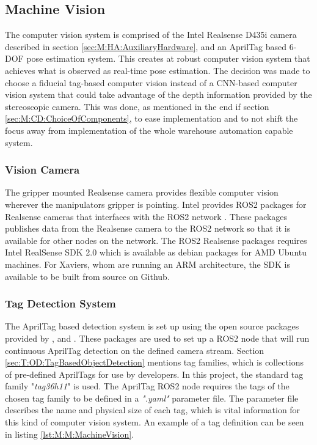 \subsection{Machine Vision} \label{sec:M:PAP:MachineVision}
The computer vision system is comprised of the Intel Realsense D435i camera described in section \ref{sec:M:HA:AuxiliaryHardware}, and an AprilTag based 6-DOF pose estimation system. This creates at robust computer vision system that achieves what is observed as real-time pose estimation. The decision was made to choose a fiducial tag-based computer vision instead of a CNN-based computer vision system that could take advantage of the depth information provided by the stereoscopic camera. This was done, as mentioned in the end if section \ref{sec:M:CD:ChoiceOfComponents}, to ease implementation and to not shift the focus away from implementation of the whole warehouse automation capable system.

\subsubsection{Vision Camera} 
The gripper mounted Realsense camera provides flexible computer vision wherever the manipulators gripper is pointing. Intel provides ROS2 packages for Realsense cameras that interfaces with the ROS2 network \cite{realsense_ros_repo}. These packages publishes data from the Realsense camera to the ROS2 network so that it is available for other nodes on the network. The ROS2 Realsense packages requires Intel RealSense SDK 2.0 which is available as debian packages for AMD Ubuntu machines. For Xaviers, whom are running an ARM architecture, the SDK is available to be built from source on Github\cite{realsense_jetson_guide}.

\subsubsection{Tag Detection System} \label{sec:M:MRC:MV:TagDetectionSystem}
The AprilTag based detection system is set up using the open source packages provided by \cite{apriltag_repo}, \cite{apriltag_ros_repo} and \cite{apriltag_msgs_repo}. These packages are used to set up a ROS2 node that will run continuous AprilTag detection on the defined camera stream. Section \ref{sec:T:OD:TagBasedObjectDetection} mentions tag families, which is collections of pre-defined AprilTags for use by developers. In this project, the standard tag family "\textit{tag36h11}" is used. The AprilTag ROS2 node requires the tags of the chosen tag family to be defined in a \textit{".yaml"} parameter file. The parameter file describes the name and physical size of each tag, which is vital information for this kind of computer vision system. An example of a tag definition can be seen in listing \ref{lst:M:M:MachineVision}.

